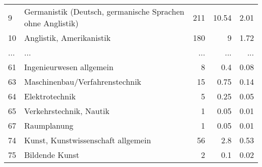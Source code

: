 \begin{longtable}{lXrrr}
        9 & \multicolumn{1}{X}{Germanistik (Deutsch, germanische Sprachen ohne Anglistik)} & %
          \num{211} &
          \num[round-mode=places,round-precision=2]{10.54} &
          \num[round-mode=places,round-precision=2]{2.01} \\
        10 & \multicolumn{1}{X}{Anglistik, Amerikanistik} & %
          \num{180} &
          \num[round-mode=places,round-precision=2]{9} &
          \num[round-mode=places,round-precision=2]{1.72} \\
       ... & ... & ... & ... & ... \\
        61 & \multicolumn{1}{X}{Ingenieurwesen allgemein} & %
          \num{8} &
          \num[round-mode=places,round-precision=2]{0.4} &
          \num[round-mode=places,round-precision=2]{0.08} \\

        63 & \multicolumn{1}{X}{Maschinenbau/Verfahrenstechnik} & %
          \num{15} &
          \num[round-mode=places,round-precision=2]{0.75} &
          \num[round-mode=places,round-precision=2]{0.14} \\

        64 & \multicolumn{1}{X}{Elektrotechnik} & %
          \num{5} &
          \num[round-mode=places,round-precision=2]{0.25} &
          \num[round-mode=places,round-precision=2]{0.05} \\

        65 & \multicolumn{1}{X}{Verkehrstechnik, Nautik} & %
          \num{1} &
          \num[round-mode=places,round-precision=2]{0.05} &
          \num[round-mode=places,round-precision=2]{0.01} \\

        67 & \multicolumn{1}{X}{Raumplanung} & %
          \num{1} &
          \num[round-mode=places,round-precision=2]{0.05} &
          \num[round-mode=places,round-precision=2]{0.01} \\

        74 & \multicolumn{1}{X}{Kunst, Kunstwissenschaft allgemein} & %
          \num{56} &
          \num[round-mode=places,round-precision=2]{2.8} &
          \num[round-mode=places,round-precision=2]{0.53} \\

        75 & \multicolumn{1}{X}{Bildende Kunst} & %
          \num{2} &
          \num[round-mode=places,round-precision=2]{0.1} &
          \num[round-mode=places,round-precision=2]{0.02} \\


\end{longtable}
